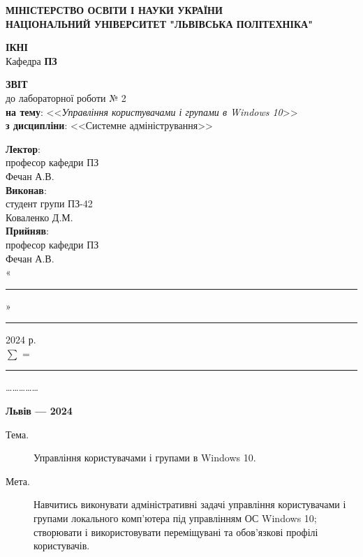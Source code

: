 \documentclass[oneside,14pt]{extarticle}
\newcommand\subject{Системне адміністрування}
\newcommand\lecturer{професор кафедри ПЗ\\Фечан А.В.}
\newcommand\teacher{професор кафедри ПЗ\\Фечан А.В.}
\newcommand\mygroup{ПЗ-42}
\newcommand\lab{2}
\newcommand\theme{Управління користувачами і групами в Windows 10}
\newcommand\purpose{Навчитись виконувати адміністративні задачі управління
	користувачами і групами локального комп’ютера під управлінням ОС Windows
	10; створювати і використовувати переміщувані та обов’язкові профілі
	користувачів}
\begin{document}
\begin{normalsize}
	\begin{titlepage}
		\thispagestyle{empty}
		\begin{center}
			\textbf{МІНІСТЕРСТВО ОСВІТИ І НАУКИ УКРАЇНИ\\
				НАЦІОНАЛЬНИЙ УНІВЕРСИТЕТ "ЛЬВІВСЬКА ПОЛІТЕХНІКА"}
		\end{center}
		\begin{flushright}
			\textbf{ІКНІ}\\
			Кафедра \textbf{ПЗ}
		\end{flushright}
		\vspace{80pt}
		\begin{center}
			\textbf{ЗВІТ}\\
			\vspace{10pt}
			до лабораторної роботи № \lab\\
			\textbf{на тему}: <<\textit{\theme}>>\\
			\textbf{з дисципліни}: <<\subject>>
		\end{center}
		\vspace{80pt}
		\begin{flushright}
			
			\textbf{Лектор}:\\
			\lecturer\\
			\vspace{28pt}
			\textbf{Виконав}:\\
			
			студент групи \mygroup\\
			Коваленко Д.М.\\
			\vspace{28pt}
			\textbf{Прийняв}:\\
			
			\teacher\\
			
			\vspace{28pt}
			«\rule{1cm}{0.15mm}» \rule{1.5cm}{0.15mm} 2024 р.\\
			$\sum$ = \rule{1cm}{0.15mm}……………\\
			
		\end{flushright}
		\vspace{\fill}
		\begin{center}
			\textbf{Львів — 2024}
		\end{center}
	\end{titlepage}
		
	\begin{description}
		\item[Тема.] \theme.
		\item[Мета.] \purpose.
	\end{description}


\end{normalsize}
\end{document}
